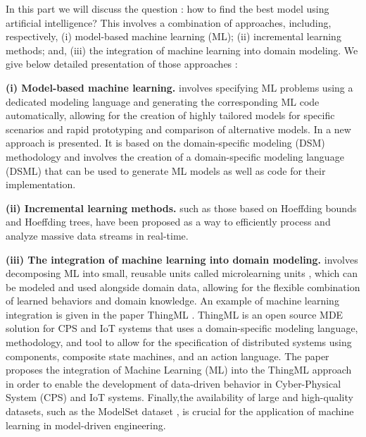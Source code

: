 



In this part we will discuss the question : how to find the best model using artificial intelligence? This involves a combination of approaches, including, respectively, (i) model-based machine learning (ML); (ii) incremental learning methods; and, (iii) the integration of machine learning into domain modeling. We give below detailed presentation of those approaches : 

\smallskip
\noindent  \textbf{(i) Model-based machine learning.}  involves specifying ML problems using a dedicated modeling language and generating the corresponding ML code automatically, allowing for the creation of highly tailored models for specific scenarios and rapid prototyping and comparison of alternative models\cite{evolutionMDE}. In \cite{mdApproach} a new approach is presented. It is based on the domain-specific modeling (DSM) methodology and involves the creation of a domain-specific modeling language (DSML) that can be used to generate ML models as well as code for their implementation.

\smallskip
\noindent  \textbf{(ii) Incremental learning methods.} such as those based on Hoeffding bounds and Hoeffding trees, have been proposed as a way to efficiently process and analyze massive data streams in real-time\cite{evolutionMDE}. 


\smallskip
\noindent  \textbf{(iii) The integration of machine learning into domain modeling.}  involves decomposing ML into small, reusable units called microlearning units \cite{evolutionMDE}, which can be modeled and used alongside domain data, allowing for the flexible combination of learned behaviors and domain knowledge. An example of machine learning integration is given in the paper ThingML \cite{ThingML}.  ThingML is an open source MDE solution for CPS and IoT systems that uses a domain-specific modeling language, methodology, and tool to allow for the specification of distributed systems using components, composite state machines, and an action language. The paper proposes the integration of Machine Learning (ML) into the ThingML approach in order to enable the development of data-driven behavior in Cyber-Physical System (CPS) and IoT systems. Finally,the availability of large and high-quality datasets, such as the ModelSet dataset \cite{modelset}, is crucial for the application of machine learning in model-driven engineering.


